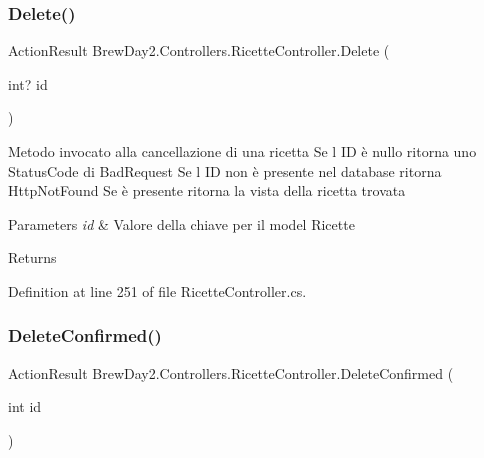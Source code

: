 \mbox{\label{class_brew_day2_1_1_controllers_1_1_ricette_controller_ade6fa19c3ce5fdda6e6c77b1e0412edf}} 
\subsubsection{\texorpdfstring{Delete()}{Delete()}}
{\footnotesize\ttfamily Action\+Result Brew\+Day2.\+Controllers.\+Ricette\+Controller.\+Delete (\begin{DoxyParamCaption}\item[{int?}]{id }\end{DoxyParamCaption})}



Metodo invocato alla cancellazione di una ricetta Se l\textquotesingle{} ID è nullo ritorna uno Status\+Code di Bad\+Request Se l\textquotesingle{} ID non è presente nel database ritorna Http\+Not\+Found Se è presente ritorna la vista della ricetta trovata 


\begin{DoxyParams}{Parameters}
{\em id} & Valore della chiave per il model Ricette\\
\hline
\end{DoxyParams}
\begin{DoxyReturn}{Returns}

\end{DoxyReturn}


Definition at line 251 of file Ricette\+Controller.\+cs.

\mbox{\label{class_brew_day2_1_1_controllers_1_1_ricette_controller_a22512431b6ea93f05438a784298b6618}} 
\subsubsection{\texorpdfstring{Delete\+Confirmed()}{DeleteConfirmed()}}
{\footnotesize\ttfamily Action\+Result Brew\+Day2.\+Controllers.\+Ricette\+Controller.\+Delete\+Confirmed (\begin{DoxyParamCaption}\item[{int}]{id }\end{DoxyParamCaption})}



